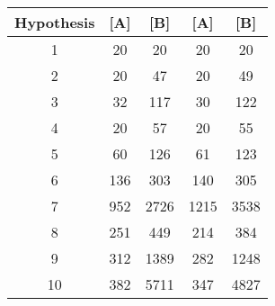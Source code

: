 \begin{tabular}{c|cccc}
Hypothesis & [A] & [B] & [A] & [B] \\
\hline
1 & 20 & 20 & 20 & 20 \\
2 & 20 & 47 & 20 & 49 \\
3 & 32 & 117 & 30 & 122 \\
4 & 20 & 57 & 20 & 55 \\
5 & 60 & 126 & 61 & 123 \\
6 & 136 & 303 & 140 & 305 \\
7 & 952 & 2726 & 1215 & 3538 \\
8 & 251 & 449 & 214 & 384 \\
9 & 312 & 1389 & 282 & 1248 \\
10 & 382 & 5711 & 347 & 4827 \\
\end{tabular}